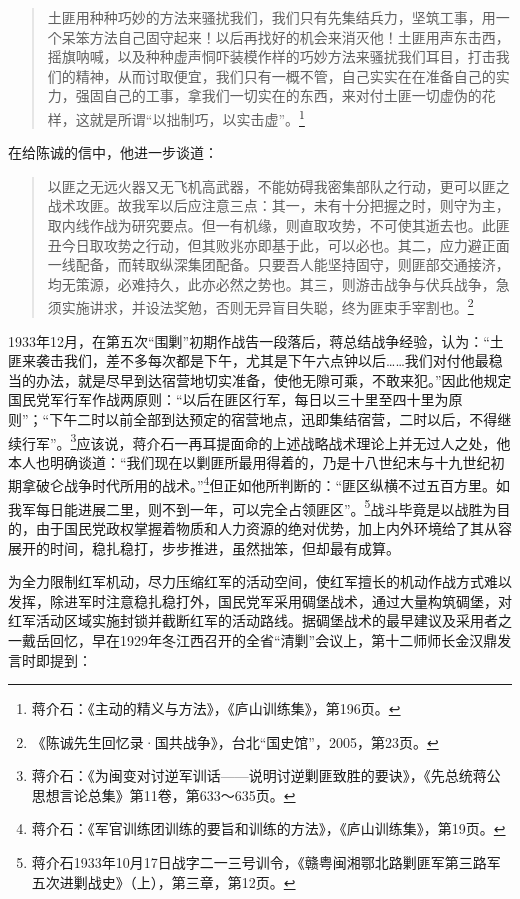 \begin{quote}

土匪用种种巧妙的方法来骚扰我们，我们只有先集结兵力，坚筑工事，用一个呆笨方法自己固守起来！以后再找好的机会来消灭他！土匪用声东击西，摇旗呐喊，以及种种虚声恫吓装模作样的巧妙方法来骚扰我们耳目，打击我们的精神，从而讨取便宜，我们只有一概不管，自己实实在在准备自己的实力，强固自己的工事，拿我们一切实在的东西，来对付土匪一切虚伪的花样，这就是所谓“以拙制巧，以实击虚”。\footnote{蒋介石：《主动的精义与方法》，《庐山训练集》，第196页。}
\end{quote}


在给陈诚的信中，他进一步谈道：

\begin{quote}

以匪之无远火器又无飞机高武器，不能妨碍我密集部队之行动，更可以匪之战术攻匪。故我军以后应注意三点：其一，未有十分把握之时，则守为主，取内线作战为研究要点。但一有机缘，则直取攻势，不可使其逝去也。此匪丑今日取攻势之行动，但其败兆亦即基于此，可以必也。其二，应力避正面一线配备，而转取纵深集团配备。只要吾人能坚持固守，则匪部交通接济，均无策源，必难持久，此亦必然之势也。其三，则游击战争与伏兵战争，急须实施讲求，并设法奖勉，否则无异盲目失聪，终为匪束手宰割也。\footnote{《陈诚先生回忆录·国共战争》，台北“国史馆”，2005，第23页。}
\end{quote}


1933年12月，在第五次“围剿”初期作战告一段落后，蒋总结战争经验，认为：“土匪来袭击我们，差不多每次都是下午，尤其是下午六点钟以后……我们对付他最稳当的办法，就是尽早到达宿营地切实准备，使他无隙可乘，不敢来犯。”因此他规定国民党军行军作战两原则：“以后在匪区行军，每日以三十里至四十里为原则”；“下午二时以前全部到达预定的宿营地点，迅即集结宿营，二时以后，不得继续行军”。\footnote{蒋介石：《为闽变对讨逆军训话——说明讨逆剿匪致胜的要诀》，《先总统蒋公思想言论总集》第11卷，第633～635页。}应该说，蒋介石一再耳提面命的上述战略战术理论上并无过人之处，他本人也明确谈道：“我们现在以剿匪所最用得着的，乃是十八世纪末与十九世纪初期拿破仑战争时代所用的战术。”\footnote{蒋介石：《军官训练团训练的要旨和训练的方法》，《庐山训练集》，第19页。}但正如他所判断的：“匪区纵横不过五百方里。如我军每日能进展二里，则不到一年，可以完全占领匪区”。\footnote{蒋介石1933年10月17日战字二一三号训令，《赣粤闽湘鄂北路剿匪军第三路军五次进剿战史》（上），第三章，第12页。}战斗毕竟是以战胜为目的，由于国民党政权掌握着物质和人力资源的绝对优势，加上内外环境给了其从容展开的时间，稳扎稳打，步步推进，虽然拙笨，但却最有成算。


为全力限制红军机动，尽力压缩红军的活动空间，使红军擅长的机动作战方式难以发挥，除进军时注意稳扎稳打外，国民党军采用碉堡战术，通过大量构筑碉堡，对红军活动区域实施封锁并截断红军的活动路线。据碉堡战术的最早建议及采用者之一戴岳回忆，早在1929年冬江西召开的全省“清剿”会议上，第十二师师长金汉鼎发言时即提到：

